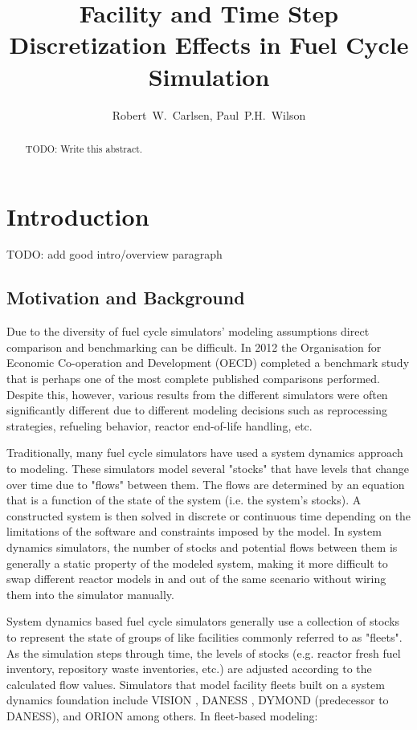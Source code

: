 \documentclass{style}
\title{Facility and Time Step Discretization Effects in Fuel Cycle Simulation}
\author{Robert~W.~Carlsen, Paul~P.H.~Wilson}
\institute{University of Wisconsin - Madison, Department of Nuclear Engineering and Engineering Physics, Madison, WI 53706}
\date{}
\begin{document}
\newpage

\begin{abstract}
TODO: Write this abstract.
\end{abstract}

\section{Introduction}

TODO: add good intro/overview paragraph 

\subsection{Motivation and Background}

Due to the diversity of fuel cycle simulators' modeling assumptions direct
comparison and benchmarking can be difficult.  In 2012 the Organisation for
Economic Co-operation and Development (OECD) completed a benchmark study
\cite{oecd2012benchmark} that is perhaps one of the most complete published
comparisons performed.  Despite this, however, various results from the
different simulators were often significantly different due to different
modeling decisions such as reprocessing strategies, refueling behavior,
reactor end-of-life handling, etc.

Traditionally, many fuel cycle simulators have used a system dynamics approach
\cite{forrester_industrial_1961} to modeling. These simulators model several
"stocks" that have levels that change over time due to "flows" between them.
The flows are determined by an equation that is a function of the state of the
system (i.e. the system's stocks).  A constructed system is then solved
in discrete or continuous time depending on the limitations of the software
and constraints imposed by the model.  In system dynamics simulators, the
number of stocks and potential flows between them is generally a static
property of the modeled system, making it more difficult to swap different
reactor models in and out of the same scenario without wiring them into the
simulator manually.

System dynamics based fuel cycle simulators generally use a collection of
stocks to represent the state of groups of like facilities commonly referred
to as "fleets".  As the simulation steps through time, the levels of stocks
(e.g. reactor fresh fuel inventory, repository waste inventories, etc.) are
adjusted according to the calculated flow values.  Simulators that model
facility fleets built on a system dynamics foundation include VISION
\cite{jacobson_verifiable_2010}, DANESS \cite{van_den_durpel_daness_2009},
DYMOND (predecessor to DANESS), and ORION \cite{gregg_orion_2012} among
others.  In fleet-based modeling:
\end{document}

